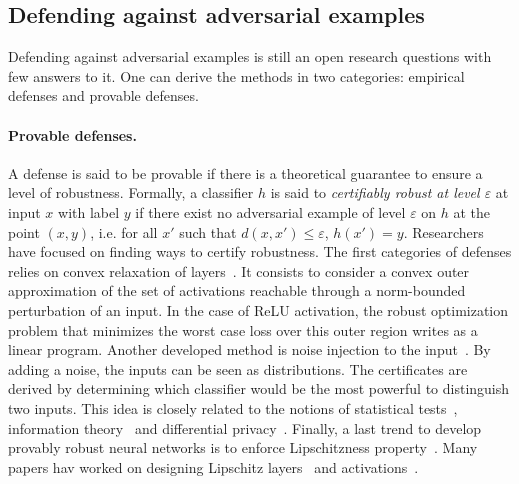 




\subsection{Defending against adversarial examples}

Defending against adversarial examples is still an open research questions with few answers to it. One can derive the methods in two categories: empirical defenses and provable defenses.

\paragraph{Provable defenses.} A defense is said to be provable if there is a theoretical guarantee to ensure a level of robustness. Formally, a classifier $h$ is said to \emph{certifiably robust at level $\varepsilon$} at input $x$ with label $y$ if there exist no adversarial example of level $\varepsilon$ on $h$ at the point $(x,y)$, i.e. for all $x'$ such that $d(x,x')\leq\varepsilon$, $h(x') = y$. Researchers have focused on finding ways to certify robustness. The first categories of defenses relies on convex relaxation of layers~\citep{wong2018provable,wong2018scaling,xxx}. It consists to consider a convex outer approximation of the set of activations reachable through a norm-bounded perturbation of an input. In the case of ReLU activation, the robust optimization problem  that minimizes the worst case loss over this outer region writes as a linear program. Another developed method is noise injection to the input~\citep{lecuyer2019certified,KolterRandomizedSmoothing,pinot2019theoretical,salman2019provably}. By adding a noise, the inputs can be seen as distributions. The certificates are derived by determining which classifier would be the most powerful to distinguish two inputs. This idea is closely related to the notions of statistical tests~\citep{KolterRandomizedSmoothing}, information theory~\citep{pinot2019theoretical} and differential privacy~\citep{lecuyer2018certified}. Finally, a last trend to develop provably robust neural networks is to enforce Lipschitzness property~\citep{tsuzuku2018lipschitz}. Many papers hav worked on designing Lipschitz layers~\citep{li2019preventing,trockman2021orthogonalizing,skew2021sahil,xxx} and activations~\citep{anil2019sorting,singla2021householder,huang2021local}.


